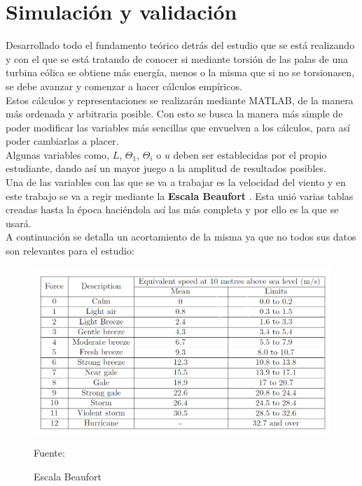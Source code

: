 \section{Simulación y validación}


Desarrollado todo el fundamento teórico detrás del estudio que se está realizando y con el que se está tratando de conocer si mediante torsión de las palas de una turbina eólica se obtiene más energía, menos o la misma que si no se torsionasen, se debe avanzar y comenzar a hacer cálculos empíricos. \\

Estos cálculos y representaciones se realizarán mediante MATLAB, de la manera más ordenada y arbitraria posible. Con esto se busca la manera más simple de poder modificar las variables más sencillas que envuelven a los cálculos, para así poder cambiarlas a placer. \\

Algunas variables como, $L$, $\Theta_1$, $\Theta_i$  o $u$ deben ser establecidas por el propio estudiante, dando así un mayor juego a la amplitud de resultados posibles. \\

Una de las variables con las que se va a trabajar es la velocidad del viento y en este trabajo se va a regir mediante la \textbf{Escala Beaufort} \cite{BeaufortScale2012}. Esta unió varias tablas creadas hasta la época haciéndola así las más completa y por ello es la que se usará.\\

A continuación se detalla un acortamiento de la misma ya que no todos sus datos son relevantes para el estudio:


\begin{figure}[H]
    \centering
    \includegraphics[width=1\textwidth]{images/Tabla Beaufort Efect.png}
    \caption{Escala Beaufort}
     Fuente: \cite{BeaufortScale2012}
     \label{tabla:escala_beaufort}
\end{figure}


